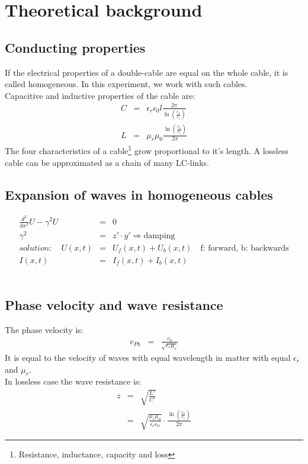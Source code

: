 \section{Theoretical background}
\subsection{Conducting properties}
If the electrical properties of a double-cable are equal on the whole cable, it is called homogeneous. In this experiment, we work with such cables.\\
Capacitive and inductive properties of the cable are:
\begin{eqnarray*}
C&=&\epsilon_r\epsilon_0l\frac{2\pi}{\ln\left(\frac{r_a}{r_i}\right)}\\
L&=&\mu_r\mu_0\frac{\ln\left(\frac{r_a}{r_i}\right)}{2\pi}
\end{eqnarray*}
The four characteristics of a cable\footnote{Resistance, inductance, capacity and loss} grow proportional to it's length. A lossless cable can be approximated as a chain of many LC-links.
\subsection{Expansion of waves in homogeneous cables}
\begin{eqnarray*}
	\frac{d^2}{dx^2}U-\gamma^2U&=&0\\
	\gamma^2&=&z'\cdot y'\Rightarrow\text{damping}\\
	solution: \quad U(x,t)&=&U_f(x,t)+U_b(x,t) \quad \text{f: forward, b: backwards}\\
	I(x,t)&=&I_f(x,t)+I_b(x,t)
\end{eqnarray*}\
\subsection{Phase velocity and wave resistance}
The phase velocity is:
\begin{eqnarray*}
v_{Ph}&=&\frac{c_0}{\sqrt{\epsilon_r\mu_r}}
\end{eqnarray*}
It is equal to the velocity of waves with equal wavelength in matter with equal $\epsilon_r$ and $\mu_r$.\\
In lossless case the wave resistance is:
\begin{eqnarray*}
z&=&\sqrt{\frac{L'}{C'}}\\
&=&\sqrt{\frac{\mu_r\mu_0}{\epsilon_r\epsilon_0}}\cdot\frac{\ln\left(\frac{r_a}{r_i}\right)}{2\pi}
\end{eqnarray*}
